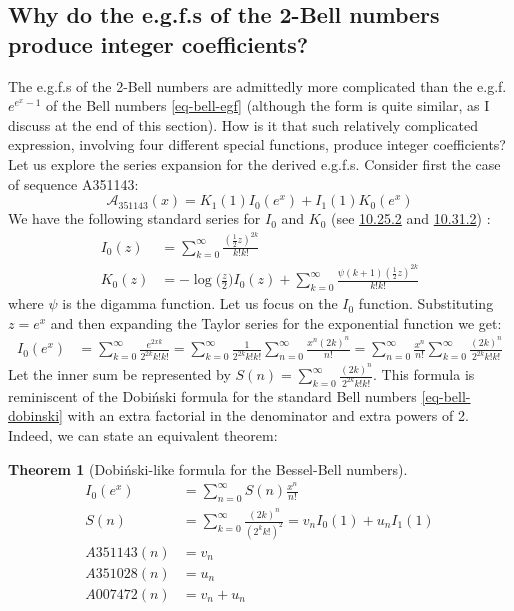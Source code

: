 \documentclass[a4paper]{amsart}
\newtheorem{theorem}{Theorem}
\begin{document}
\subsection{Why do the e.g.f.s of the 2-Bell numbers produce integer coefficients?}\label{2-bell-integer-coefs}
The e.g.f.s of the 2-Bell numbers are admittedly more complicated than the e.g.f. $e^{e^x-1}$ of the Bell numbers \eqref{eq-bell-egf} (although the form is quite similar, as I discuss at the end of this section). How is it that such relatively complicated expression, involving four different special functions, produce integer coefficients? Let us explore the series expansion for the derived e.g.f.s. Consider first the case of sequence A351143:
\[
\mathcal{A}_{351143}(x) = K_1(1)I_0(e^x) + I_1(1)K_0(e^x)
\]
We have the following standard series for $I_0$ and $K_0$ (see \href{https://dlmf.nist.gov/10.25.E2}{10.25.2} and \href{https://dlmf.nist.gov/10.31.E2}{10.31.2}) \cite{NIST:DLMF}:
\begin{equation}\label{eq-i-k-0-series}
    \begin{aligned}
        I_0(z) &= \sum_{k=0}^{\infty} \frac{(\frac{1}{2}z)^{2k}}{k!k!} \\
        K_0(z) &= -\log\biggl(\frac{z}{2}\biggr)I_0(z) + \sum_{k=0}^{\infty}\frac{\psi(k+1)(\frac{1}{2}z)^{2k}}{k!k!}
    \end{aligned}
\end{equation}
where $\psi$ is the digamma function. Let us focus on the $I_0$ function. Substituting $z=e^x$ and then expanding the Taylor series for the exponential function we get:
\begin{equation}\label{eq-besseli-exp-maclaurin}
\begin{aligned}
I_0(e^x) &= \sum_{k=0}^{\infty} \frac{e^{2xk}}{2^{2k}k!k!} = \sum_{k=0}^{\infty} \frac{1}{2^{2k}k!k!}\sum_{n=0}^{\infty}\frac{x^n(2k)^n}{n!} = \sum_{n=0}^{\infty}\frac{x^n}{n!}\sum_{k=0}^{\infty} \frac{(2k)^n}{2^{2k}k!k!}
\end{aligned}
\end{equation}
Let the inner sum be represented by $S(n) = \sum_{k=0}^{\infty} \frac{(2k)^n}{2^{2k}k!k!}$. This formula is reminiscent of the Dobiński formula for the standard Bell numbers \eqref{eq-bell-dobinski} with an extra factorial in the denominator and extra powers of 2. Indeed, we can state an equivalent theorem:

\begin{theorem}[Dobiński-like formula for the Bessel-Bell numbers]\label{thm-bessel-dobiski}
\[
\begin{aligned}
I_0(e^x) &= \sum_{n=0}^\infty S(n) \frac{x^n}{n!} \\
S(n) &= \sum_{k=0}^{\infty} \frac{(2k)^n}{(2^{k}k!)^2}=v_n I_0(1) + u_n I_1(1) \\
A351143(n) &= v_n \\
A351028(n) &= u_n \\
A007472(n) &= v_n+u_n
\end{aligned}
\]
\end{theorem}
\end{document}
